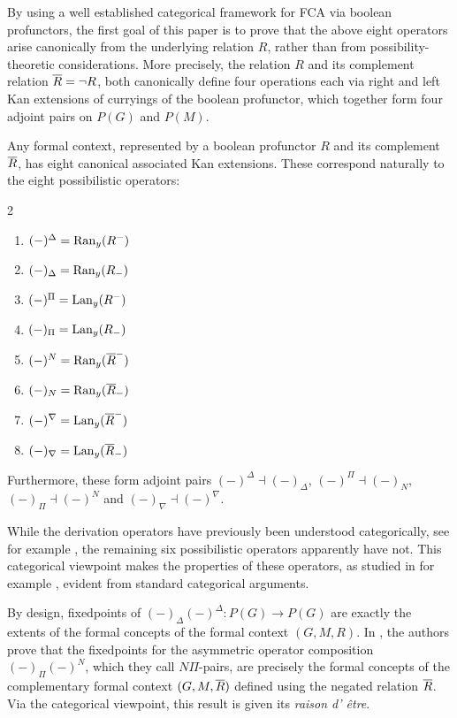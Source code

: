 By using a well established categorical framework for FCA via boolean profunctors, the first goal of this paper is to prove that the above eight operators arise canonically from the underlying relation $R$, rather than from possibility-theoretic considerations. More precisely, the relation $R$ and its complement relation $\overline{R} = \neg R$, both canonically define four operations each via right and left Kan extensions of curryings of the boolean profunctor, which together form four adjoint pairs on $P(G)$ and $P(M)$. 

\begin{introthm}
    Any formal context, represented by a boolean profunctor $R$ and its complement $\overline{R}$, has eight canonical associated Kan extensions. These correspond naturally to the eight possibilistic operators: 
    \begin{multicols}{2}
    \begin{enumerate}
        \item $(-)^\Delta = \operatorname{Ran}_y(R^-)$
        \item $(-)_\Delta = \operatorname{Ran}_y(R_-)$
        \item $(-)^\Pi = \operatorname{Lan}_y(R^-)$
        \item $(-)_\Pi = \operatorname{Lan}_y(R_-)$
        \item $(-)^N = \operatorname{Ran}_y(\overline{R}^-)$
        \item $(-)_N = \operatorname{Ran}_y(\overline{R}_-)$
        \item $(-)^\nabla = \operatorname{Lan}_y(\overline{R}^-)$
        \item $(-)_\nabla = \operatorname{Lan}_y(\overline{R}_-)$
    \end{enumerate}
    \end{multicols}
    Furthermore, these form adjoint pairs $(-)^\Delta\dashv (-)_\Delta$, $(-)^\Pi\dashv (-)_N$, $(-)_\Pi\dashv (-)^N$ and $(-)_\nabla\dashv (-)^\nabla$. 
\end{introthm}

While the derivation operators have previously been understood categorically, see for example \cite{ferrer_2023}, the remaining six possibilistic operators apparently have not. This categorical viewpoint makes the properties of these operators, as studied in for example \cite{djouadi_prade_2011}, evident from standard categorical arguments. 

By design, fixedpoints of $(-)_\Delta (-)^\Delta : P(G) \to P(G)$ are exactly the extents of the formal concepts of the formal context $(G,M,R)$. In \cite{djouadi_prade_2011, yakub-djouadi-dubois-prade_2016}, the authors prove that the fixedpoints for the asymmetric operator composition $(-)_\Pi (-)^N$, which they call $N\Pi$-pairs, are precisely the formal concepts of the complementary formal context $(G,M,\overline{R})$ defined using the negated relation $\overline{R}$. Via the categorical viewpoint, this result is given its \emph{raison d'
être}. 

